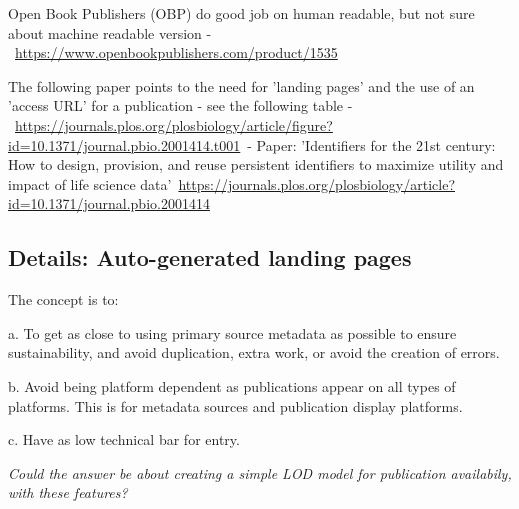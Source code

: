 \documentclass{article}
\begin{document}
Open Book Publishers (OBP) do good job on human readable, but not sure about machine readable version - \href{https://www.openbookpublishers.com/product/1535}{https://www.openbookpublishers.com/product/1535}


The following paper points to the need for 'landing pages' and the use of an 'access URL' for a publication - see the following table - \href{https://journals.plos.org/plosbiology/article/figure?id=10.1371/journal.pbio.2001414.t001}{https://journals.plos.org/plosbiology/article/figure?id=10.1371/journal.pbio.2001414.t001} - Paper: 'Identifiers for the 21st century: How to design, provision, and reuse persistent identifiers to maximize utility and impact of life science data' \href{https://journals.plos.org/plosbiology/article?id=10.1371/journal.pbio.2001414}{https://journals.plos.org/plosbiology/article?id=10.1371/journal.pbio.2001414}


\subsection{\textbf{Details: Auto-generated landing pages}}\label{H8497618}



The concept is to:


a. To get as close to using primary source metadata as possible to ensure sustainability, and avoid duplication, extra work, or avoid the creation of errors.


b. Avoid being platform dependent as publications appear on all types of platforms. This is for metadata sources and publication display platforms.


c. Have as low technical bar for entry.


\emph{Could the answer be about creating a simple LOD model for publication availabily, with these features?}
\end{document}
